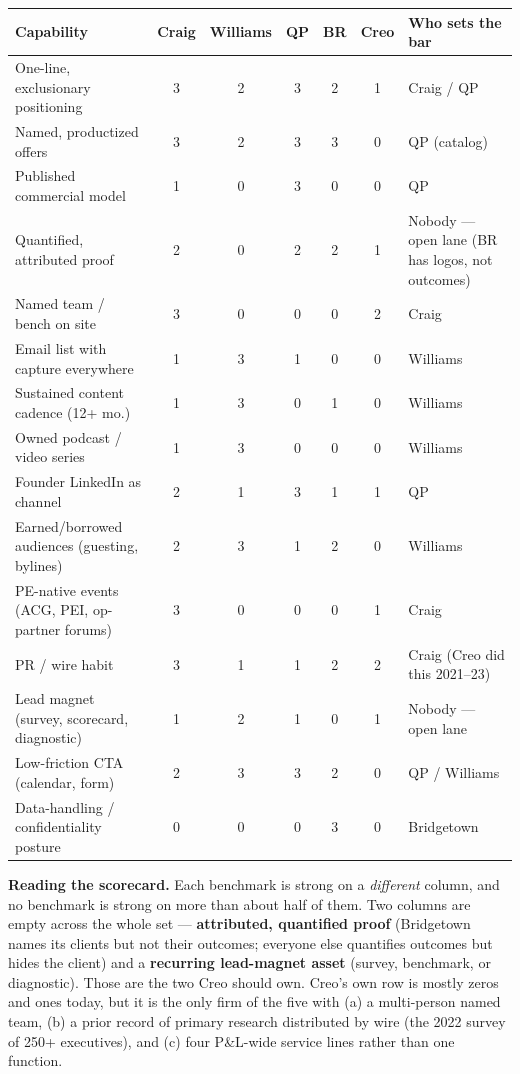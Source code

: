 \documentclass[11pt]{article}
\begin{document}
\begin{center}
\renewcommand{\arraystretch}{1.25}
\small
\begin{tabular}{R{4.4cm} c c c c c R{3.4cm}}
\toprule
\textbf{Capability} & \textbf{Craig} & \textbf{Williams} & \textbf{QP} & \textbf{BR} & \textbf{Creo} & \textbf{Who sets the bar} \\
\midrule
One-line, exclusionary positioning & 3 & 2 & 3 & 2 & 1 & Craig / QP \\
Named, productized offers & 3 & 2 & 3 & 3 & 0 & QP (catalog) \\
Published commercial model & 1 & 0 & 3 & 0 & 0 & QP \\
Quantified, attributed proof & 2 & 0 & 2 & 2 & 1 & Nobody --- open lane (BR has logos, not outcomes) \\
Named team / bench on site & 3 & 0 & 0 & 0 & 2 & Craig \\
Email list with capture everywhere & 1 & 3 & 1 & 0 & 0 & Williams \\
Sustained content cadence (12+ mo.) & 1 & 3 & 0 & 1 & 0 & Williams \\
Owned podcast / video series & 1 & 3 & 0 & 0 & 0 & Williams \\
Founder LinkedIn as channel & 2 & 1 & 3 & 1 & 1 & QP \\
Earned/borrowed audiences (guesting, bylines) & 2 & 3 & 1 & 2 & 0 & Williams \\
PE-native events (ACG, PEI, op-partner forums) & 3 & 0 & 0 & 0 & 1 & Craig \\
PR / wire habit & 3 & 1 & 1 & 2 & 2 & Craig (Creo did this 2021--23) \\
Lead magnet (survey, scorecard, diagnostic) & 1 & 2 & 1 & 0 & 1 & Nobody --- open lane \\
Low-friction CTA (calendar, form) & 2 & 3 & 3 & 2 & 0 & QP / Williams \\
Data-handling / confidentiality posture & 0 & 0 & 0 & 3 & 0 & Bridgetown \\
\bottomrule
\end{tabular}
\end{center}

\begin{takeaway}
\textbf{Reading the scorecard.} Each benchmark is strong on a \emph{different} column,
and no benchmark is strong on more than about half of them. Two columns are empty
across the whole set --- \textbf{attributed, quantified proof} (Bridgetown names its
clients but not their outcomes; everyone else quantifies outcomes but hides the
client) and a \textbf{recurring lead-magnet asset} (survey, benchmark, or diagnostic).
Those are the two Creo should own. Creo's own row is mostly zeros and ones today, but
it is the only firm of the five with (a) a multi-person named team, (b) a prior record of primary research
distributed by wire (the 2022 survey of 250+ executives), and (c) four P\&L-wide
service lines rather than one function.
\end{takeaway}
\end{document}
